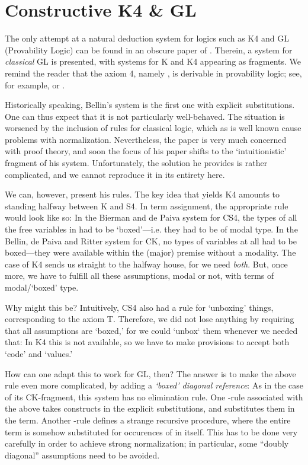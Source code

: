 \documentclass[a4paper]{amsart}
\begin{document}
\section{Constructive \textsf{K4} \& \textsf{GL}}
  \label{sec:ck4gl}

The only attempt at a natural deduction system for logics such as
\textsf{K4} and \textsf{GL} (Provability Logic) can be found in an
obscure paper of \cite{Bellin1985}. Therein, a system for
\emph{classical} \textsf{GL} is presented, with systems for
\textsf{K} and \textsf{K4} appearing as fragments. We remind the
reader that the axiom \textsf{4}, namely , is derivable in provability logic; see, for example,
\cite{Boolos1994} or \cite{Artemov2002}.

Historically speaking, Bellin's system is the first one with
explicit substitutions. One can thus expect that it is not
particularly well-behaved. The situation is worsened by the
inclusion of rules for classical logic, which as is well known
cause problems with normalization. Nevertheless, the paper is very
much concerned with proof theory, and soon the focus of his paper
shifts to the `intuitionistic' fragment of his system.
Unfortunately, the solution he provides is rather complicated, and
we cannot reproduce it in its entirety here.

We can, however, present his rules. The key idea that yields
\textsf{K4} amounts to standing halfway between \textsf{K} and
\textsf{S4}. In term assignment, the appropriate rule would
look like so:  In the Bierman and de Paiva system for \textsf{CS4}, the types
of all the free variables in  had to be `boxed'---i.e. they had
to be of modal type. In the Bellin, de Paiva and Ritter
system for \textsf{CK}, no types of variables at all had to be
boxed---they were available within the (major) premise without a
modality. The case of \textsf{K4} sends us straight to the halfway
house, for we need \emph{both}. But, once more, we have to fulfill
all these assumptions, modal or not, with terms of modal/`boxed'
type.

Why might this be? Intuitively, \textsf{CS4} also had a rule for
`unboxing' things, corresponding to the axiom \textsf{T}.
Therefore, we did not lose anything by requiring that all
assumptions are `boxed,' for we could `unbox` them whenever we
needed that:  In \textsf{K4} this is not available, so we have to make
provisions to accept both `code' and `values.'

How can one adapt this to work for \textsf{GL}, then? The answer
is to make the above rule even more complicated, by adding a
\emph{`boxed' diagonal reference}:  As in the case of its \textsf{CK}-fragment, this system has no
elimination rule. One -rule associated with the above
takes  constructs in the explicit substitutions, and
substitutes them in the term. Another -rule defines a
strange recursive procedure, where the entire term is somehow
substituted for occurences of  in itself. This has to be done
very carefully in order to achieve strong normalization; in
particular, some ``doubly diagonal'' assumptions need to be
avoided.
\end{document}
